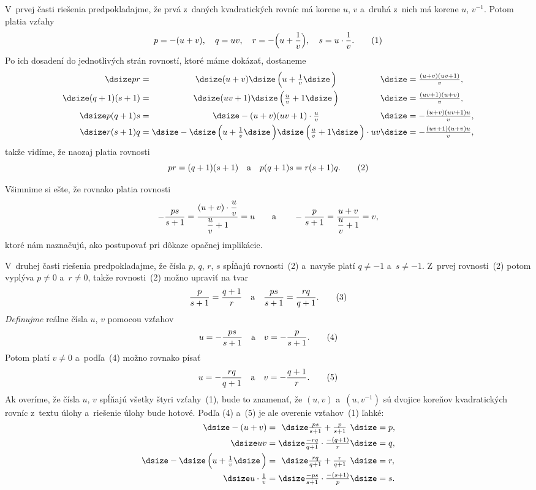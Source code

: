 {%
V~prvej časti riešenia predpokladajme, že prvá z~daných
kvadratických rovníc má korene $u$, $v$ a~druhá z~nich
má korene $u$, $v^{-1}$. Potom platia vzťahy
$$
p=-(u+v),\quad q=uv,\quad r=-\Bigl(u+\frac{1}{v}\Bigr),\quad
s=u\cdot\frac{1}{v}.
\tag1
$$
Po ich dosadení
do jednotlivých strán rovností, ktoré máme dokázať, dostaneme
$$
\vbox{\openup\jot \let\\=\cr \everymath{\dsize}
\halign{\hfil$#{}$&\hfil$#$\hfil&${}#$\hfil\cr
         pr=&(u+v)\Bigl(u+\frac{1}{v}\Bigr)&=\frac{(u+v)(uv+1)}{v},\\
(q+1)(s+1)=&(uv+1)\Bigl(\frac{u}{v}+1\Bigr)&=\frac{(uv+1)(u+v)}{v},\\
      p(q+1)s=&-(u+v)(uv+1)\cdot\frac{u}{v}&=-\frac{(u+v)(uv+1)u}{v},\\
r(s+1)q=&-\Bigl(u+\frac{1}{v}\Bigr)\Bigl(\frac{u}{v}+1\Bigr)\cdot uv
                                           &=-\frac{(uv+1)(u+v)u}{v},\\
}}
$$
takže vidíme, že naozaj platia rovnosti
$$
     pr=(q+1)(s+1)     \quad\text{a}\quad
p(q+1)s=r(s+1)q.
\tag2
$$

Všimnime si ešte, že rovnako platia rovnosti
$$
\postdisplaypenalty 10000
-\frac{ps}{s+1}=\frac{(u+v)\cdot\dfrac{u}{v}}{\dfrac{u}{v}+1}=u
\qquad\text{a}\qquad
-\frac{p}{s+1}=\frac{u+v}{\dfrac{u}{v}+1}=v,
$$
ktoré nám naznačujú, ako postupovať pri dôkaze opačnej implikácie.

\smallskip
V~druhej časti riešenia predpokladajme,
že čísla $p$, $q$, $r$, $s$ spĺňajú rovnosti~(2) a~navyše
platí $q\ne{-1}$ a~$s\ne{-1}$.  Z~prvej rovnosti~(2) potom vyplýva
$p\ne0$ a~$r\ne0$, takže rovnosti~(2) možno upraviť na tvar
$$
\frac{p}{s+1}=\frac{q+1}{r}\quad\text{a}\quad
\frac{ps}{s+1}=\frac{rq}{q+1}.
\tag3
$$
{\it Definujme\/} reálne čísla $u$, $v$ pomocou vzťahov
$$
u=-\frac{ps}{s+1}\quad\text{a}\quad
v=-\frac{p}{s+1}.
\tag4
$$
Potom platí $v\ne0$ a~podľa~(4) možno rovnako písať
$$
u=-\frac{rq}{q+1}\quad\text{a}\quad
v=-\frac{q+1}{r}.
\tag5
$$
Ak overíme, že čísla $u$, $v$ spĺňajú všetky
štyri vzťahy~(1), bude to znamenať,
že $(u,v)$ a~$(u,v^{-1})$ sú dvojice koreňov
kvadratických rovníc z~textu úlohy a~riešenie úlohy bude hotové.
Podľa (4) a~(5) je ale overenie vzťahov~(1) ľahké:
$$
\vbox{\openup\jot \let\\=\cr \everymath{\dsize}
\halign{\hfil$#{}$&\hfil$#$\hfil&${}#$\hfil\cr
-(u+v)=&\frac{ps}{s+1}+\frac{p}{s+1}&=p,\\
uv=&\frac{- rq}{q+1}\cdot\frac{-(q+1)}{r}&=q,\\
-\Bigl(u+\frac{1}{v}\Bigr)=&\frac{rq}{q+1}+\frac{r}{q+1}&=r,\\
u\cdot\frac{1}{v}=&\frac{- ps}{s+1}\cdot\frac{-(s+1)}{p}&=s.\\
}}
$$}

